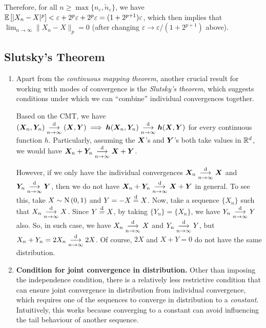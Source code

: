 \begin{enumerate}
\begin{pf}
Therefore, for all \(n\ge\max\{n_{\varepsilon},\widetilde{n}_{\varepsilon}\}\),
we have \(\mathbb{E}\left[|X_n-X|^{p}\right]<\varepsilon+2^p\varepsilon+2^p
\varepsilon=(1+2^{p+1})\varepsilon\), which then implies that
\(\lim_{n\to\infty}\|X_n-X\|_{p}=0\) (after changing
\(\varepsilon\to\varepsilon/(1+2^{p+1})\) above).
\end{pf}
\end{enumerate}
\subsection{Slutsky's Theorem}
\begin{enumerate}
\item Apart from the \emph{continuous mapping theorem}, another crucial result
for working with modes of convergence is the \emph{Slutsky's theorem}, which
suggests conditions under which we can ``combine'' individual convergences
together.

Based on the CMT, we have \((\bm{X}_n,\bm{Y}_n)\underset{n\to\infty}{\overset{\text{d}}{\longrightarrow}} (\bm{X},\bm{Y})\implies 
\bm{h}(\bm{X}_n,\bm{Y}_n)\underset{n\to\infty}{\overset{\text{d}}{\longrightarrow}} \bm{h}(\bm{X},\bm{Y})\) for every
continuous function \(h\). Particularly, assuming the \(\bm{X}\)'s and
\(\bm{Y}\)'s both take values in \(\mathbb{R}^d\), we would have
\(\bm{X}_n+\bm{Y}_n\underset{n\to\infty}{\overset{\text{d}}{\longrightarrow}} \bm{X}+\bm{Y}\).

However, if we only have the individual convergences \(\bm{X}_n\underset{n\to\infty}{\overset{\text{d}}{\longrightarrow}}
\bm{X}\) and \(\bm{Y}_n\underset{n\to\infty}{\overset{\text{d}}{\longrightarrow}} \bm{Y}\), then we do not have
\(\bm{X}_n+\bm{Y}_n\underset{n\to\infty}{\overset{\text{d}}{\longrightarrow}} \bm{X}+\bm{Y}\) in general. To see this,
take \(X\sim\operatorname{N}\left(0,1\right)\) and \(Y=-X\overset{\text{d}}= X\). Now, take a sequence \(\{X_n\}\)
such that \(X_n\underset{n\to\infty}{\overset{\text{d}}{\longrightarrow}} X\). Since \(Y\overset{\text{d}}= X\), by taking \(\{Y_n\}=\{X_n\}\),
we have \(Y_n\underset{n\to\infty}{\overset{\text{d}}{\longrightarrow}} Y\) also. So, in such case, we have \(X_n\underset{n\to\infty}{\overset{\text{d}}{\longrightarrow}} X\) and \(Y_n\underset{n\to\infty}{\overset{\text{d}}{\longrightarrow}} Y\),
but \(X_n+Y_n=2X_n\underset{n\to\infty}{\overset{\text{d}}{\longrightarrow}} 2X\). Of course, \(2X\) and \(X+Y=0\) do not have the
same distribution.
\item \textbf{Condition for joint convergence in distribution.}
Other than imposing the independence condition, there is a relatively less
restrictive condition that can ensure joint convergence in distribution from
individual convergence, which requires one of the sequences to converge in
distribution to a \emph{constant}. Intuitively, this works because converging
to a constant can avoid influencing the tail behaviour of another sequence.


\end{enumerate}
